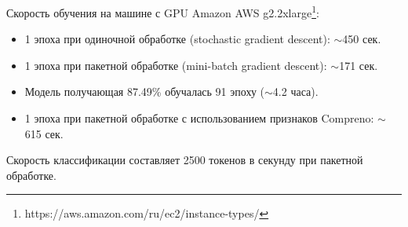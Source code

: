 Скорость обучения на машине с GPU Amazon AWS g2.2xlarge\footnote{https://aws.amazon.com/ru/ec2/instance-types/}:
\begin{itemize}
\item 1 эпоха при одиночной обработке (stochastic gradient descent): $\sim$450 сек.
\item 1 эпоха при пакетной обработке (mini-batch gradient descent): $\sim$171 сек.
\item Модель получающая 87.49\% обучалась 91 эпоху ($\sim$4.2 часа).
\item 1 эпоха при пакетной обработке с использованием признаков Compreno: $\sim$615 сек.
\end{itemize}

Скорость классификации составляет 2500 токенов в секунду при пакетной обработке.
